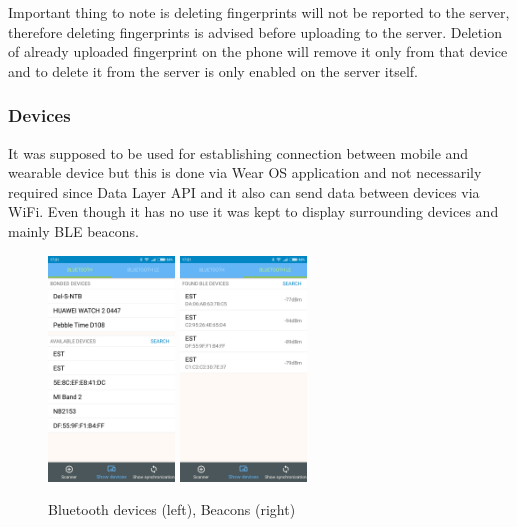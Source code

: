 Important thing to note is deleting fingerprints will not be reported to the server, therefore deleting fingerprints is advised before uploading to the server. Deletion of already uploaded fingerprint on the phone will remove it only from that device and to delete it from the server is only enabled on the server itself. 

\subsubsection{Devices}\label{subsec:Devices}
It was supposed to be used for establishing connection between mobile and wearable device but this is done via Wear OS application and not necessarily required since Data Layer API and it also can send data between devices via WiFi. Even though it has no use it was kept to display surrounding devices and mainly BLE beacons.

\begin{figure}[h!]
	\begin{centering}
		\includegraphics[width=0.30\textwidth]{img/devices_bl}
		\includegraphics[width=0.30\textwidth]{img/devices_ble}
		\par\end{centering}
	\caption{Bluetooth devices (left), Beacons (right)\label{fig:bl_ble_list}}
	\label{fig07c05}
\end{figure}

